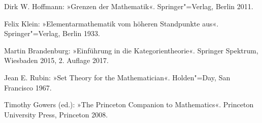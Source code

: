
\begin{thebibliography}{00}

Dirk W. Hoffmann: »Grenzen der Mathematik«.
Springer"=Verlag, Berlin 2011.

Felix Klein: »Elementarmathematik vom höheren Standpunkte aus«.\\
Springer"=Verlag, Berlin 1933.

Martin Brandenburg: »Einführung in die Kategorientheorie«.
Springer Spektrum, Wiesbaden 2015, 2. Auflage 2017.

Jean E. Rubin: »Set Theory for the Mathematician«.
Holden"=Day, San Francisco 1967.

Timothy Gowers (ed.): »The Princeton Companion to Mathematics«.
Princeton University Press, Princeton 2008.

\end{thebibliography}
